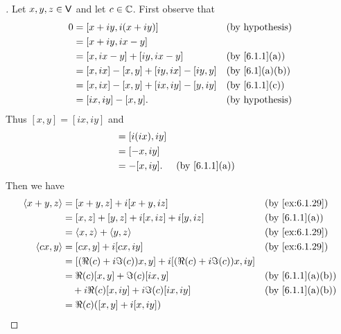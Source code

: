 \begin{proof}[]
  Let \(x, y, z \in \mathsf{V}\) and let \(c \in \mathbb{C}\).
  First observe that
  \begin{align*}
    0 & = [x + iy, i(x + iy)]                   &  & \text{(by hypothesis)} \\
      & = [x + iy, ix - y]                                                  \\
      & = [x, ix - y] + [iy, ix - y]            &  & \by{6.1.1}[a]          \\
      & = [x, ix] - [x, y] + [iy, ix] - [iy, y] &  & \by{6.1}[a,b]          \\
      & = [x, ix] - [x, y] + [ix, iy] - [y, iy] &  & \by{6.1.1}[c]          \\
      & = [ix, iy] - [x, y].                    &  & \text{(by hypothesis)}
  \end{align*}
  Thus \([x, y] = [ix, iy]\) and
  \begin{align*}
    [ix, y] & = [i(ix), iy]                    \\
            & = [-x, iy]                       \\
            & = -[x, iy].   &  & \by{6.1.1}[a]
  \end{align*}
  Then we have
  \begin{align*}
    \inn{x + y, z}    & = [x + y, z] + i[x + y, iz]                                 &  & \by{ex:6.1.29}                \\
                      & = [x, z] + [y, z] + i[x, iz] + i[y, iz]                     &  & \by{6.1.1}[a]                 \\
                      & = \inn{x, z} + \inn{y, z}                                   &  & \by{ex:6.1.29}                \\
    \inn{cx, y}       & = [cx, y] + i[cx, iy]                                       &  & \by{ex:6.1.29}                \\
                      & = [(\Re(c) + i \Im(c)) x, y] + i[(\Re(c) + i \Im(c)) x, iy]                                    \\
                      & = \Re(c) [x, y] + \Im(c) [ix, y]                            &  & \by{6.1.1}[a,b]               \\
                      & \quad + i \Re(c) [x, iy] + i \Im(c) [ix, iy]                &  & \by{6.1.1}[a,b]               \\
                      & = \Re(c) ([x, y] + i[x, iy])                                                                   \\

\end{align*}
\end{proof}
